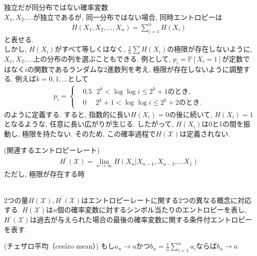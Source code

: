 \documentclass[a4j]{jsarticle}
\begin{document}
 独立だが同分布ではない確率変数\\

$X_1, X_2, \ldots$が独立であるが, 同一分布ではない場合, 同時エントロピーは
\begin{align}
	H(X_1, X_2, \ldots, X_n) = \sum_{i=1}^{n} H(X_i)
\end{align}
と表せる.\\

しかし, $H(X_i)$がすべて等しくはなく, $\frac{1}{n} \sum H(X_i)$の極限が存在しないように, $X_1, X_2, \ldots$上の分布の列を選ぶこともできる. 例として, $p_i = \mathbb{P}[X_i = 1]$が定数ではなく$i$の関数であるランダムな2進数列を考え, 極限が存在しないように調整する. 例えば$k = 0, 1, \ldots$として
\begin{align}
	p_i = \begin{cases}
		       & 0.5 \:\:\: 2^k < \log\log i \leq 2^k +1 \mbox{のとき},        \\
		       & 0 \:\:\:\:\:\: 2^k +1 < \log\log i \leq 2^k +2 \mbox{のとき}.
	      \end{cases}
\end{align}
のように定義する.
すると, 指数的に長い$H(X_i)=0$の後に続いて, $H(X_i) = 1$となるような, 任意に長い広がりが生じる. したがって, $H(X_i)$は0と1の間を振動し, 極限を持たない. そのため, この確率過程で$H(\mathcal{X})$は定義されない.\\

\begin{itembox}[l]{ (関連するエントロピーレート)}
	\begin{align}
		H^\prime(\mathcal{X}) = \lim_{n \rightarrow \infty} H(X_n | X_{n-1}, X_{n-2}, \ldots X_1)
	\end{align}
	ただし, 極限が存在する時
\end{itembox}\\

 2つの量$H(\mathcal{X}), H^\prime(\mathcal{X})$はエントロピーレートに関する2つの異なる概念に対応する. $H(\mathcal{X})$は$n$個の確率変数に対するシンボル当たりのエントロピーを表し, $H^\prime(\mathcal{X})$は過去が与えられた場合の最後の確率変数に関する条件付エントロピーを表す.\\

\begin{itembox}[l]{ (チェザロ平均（cesáro mean）)}
	もし$a_n \rightarrow a$かつ$b_n = \frac{1}{n} \sum_{i=1}^{n} a_i$ならば$b_n \rightarrow a$
\end{itembox}\\
\end{document}
